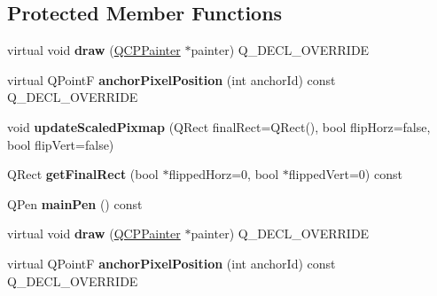 \subsection*{Protected Member Functions}
\begin{DoxyCompactItemize}
\item 
virtual void {\bfseries draw} (\hyperlink{class_q_c_p_painter}{Q\+C\+P\+Painter} $\ast$painter) Q\+\_\+\+D\+E\+C\+L\+\_\+\+O\+V\+E\+R\+R\+I\+DE\hypertarget{class_q_c_p_item_pixmap_a9538a7d37fe20a4ff4bb2cb5bbbf2b48}{}\label{class_q_c_p_item_pixmap_a9538a7d37fe20a4ff4bb2cb5bbbf2b48}

\item 
virtual Q\+PointF {\bfseries anchor\+Pixel\+Position} (int anchor\+Id) const Q\+\_\+\+D\+E\+C\+L\+\_\+\+O\+V\+E\+R\+R\+I\+DE\hypertarget{class_q_c_p_item_pixmap_a5803d8e173bc4d48619fc43701db32e5}{}\label{class_q_c_p_item_pixmap_a5803d8e173bc4d48619fc43701db32e5}

\item 
void {\bfseries update\+Scaled\+Pixmap} (Q\+Rect final\+Rect=Q\+Rect(), bool flip\+Horz=false, bool flip\+Vert=false)\hypertarget{class_q_c_p_item_pixmap_a8bced3027b326b290726cd1979c7cfc6}{}\label{class_q_c_p_item_pixmap_a8bced3027b326b290726cd1979c7cfc6}

\item 
Q\+Rect {\bfseries get\+Final\+Rect} (bool $\ast$flipped\+Horz=0, bool $\ast$flipped\+Vert=0) const \hypertarget{class_q_c_p_item_pixmap_a245ef0c626cab7096a810442f2f6a2d9}{}\label{class_q_c_p_item_pixmap_a245ef0c626cab7096a810442f2f6a2d9}

\item 
Q\+Pen {\bfseries main\+Pen} () const \hypertarget{class_q_c_p_item_pixmap_af21085516585c475dc9d839e7f377233}{}\label{class_q_c_p_item_pixmap_af21085516585c475dc9d839e7f377233}

\item 
virtual void {\bfseries draw} (\hyperlink{class_q_c_p_painter}{Q\+C\+P\+Painter} $\ast$painter) Q\+\_\+\+D\+E\+C\+L\+\_\+\+O\+V\+E\+R\+R\+I\+DE\hypertarget{class_q_c_p_item_pixmap_a721462da0bbccac5e8759921390b1197}{}\label{class_q_c_p_item_pixmap_a721462da0bbccac5e8759921390b1197}

\item 
virtual Q\+PointF {\bfseries anchor\+Pixel\+Position} (int anchor\+Id) const Q\+\_\+\+D\+E\+C\+L\+\_\+\+O\+V\+E\+R\+R\+I\+DE\hypertarget{class_q_c_p_item_pixmap_a5d576c14fdc7999c000a6aed1b7c2fb0}{}\label{class_q_c_p_item_pixmap_a5d576c14fdc7999c000a6aed1b7c2fb0}


\end{DoxyCompactItemize}

